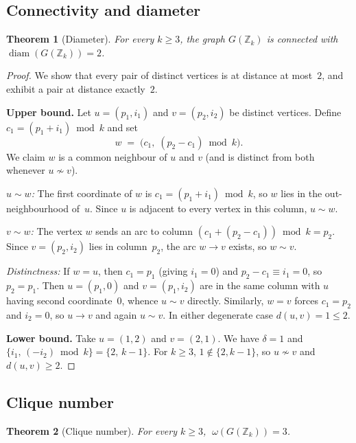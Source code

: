 \documentclass[12pt]{article}
\newtheorem{theorem}{Theorem}[section]
\theoremstyle{definition}
\theoremstyle{remark}
\newcommand{\Z}{\mathbb{Z}}
\newcommand{\GZk}{G(\Z_k)}
\begin{document}
\subsection{Connectivity and diameter}

\begin{theorem}[Diameter]
\label{thm:diam}
For every $k \ge 3$, the graph $\GZk$ is connected with
$\operatorname{diam}(\GZk) = 2$.
\end{theorem}

\begin{proof}
We show that every pair of distinct vertices is at distance at most~$2$,
and exhibit a pair at distance exactly~$2$.

\smallskip\noindent\textbf{Upper bound.}
Let $u = (p_1, i_1)$ and $v = (p_2, i_2)$ be distinct vertices.
Define $c_1 = (p_1 + i_1) \bmod k$ and set
\[
  w \;=\; \bigl(c_1,\; (p_2 - c_1) \bmod k\bigr).
\]
We claim $w$ is a common neighbour of $u$ and $v$ (and is distinct from both
whenever $u \not\sim v$).

\emph{$u \sim w$:}  The first coordinate of $w$ is $c_1 = (p_1 + i_1) \bmod k$,
so $w$ lies in the out-neighbourhood of~$u$.  Since $u$ is adjacent to every
vertex in this column, $u \sim w$.

\emph{$v \sim w$:}  The vertex $w$ sends an arc to column
$(c_1 + (p_2 - c_1)) \bmod k = p_2$.  Since $v = (p_2, i_2)$ lies in column~$p_2$,
the arc $w \to v$ exists, so $w \sim v$.

\emph{Distinctness:}  If $w = u$, then $c_1 = p_1$ (giving $i_1 = 0$) and
$p_2 - c_1 \equiv i_1 = 0$, so $p_2 = p_1$.  Then $u = (p_1, 0)$ and
$v = (p_1, i_2)$ are in the same column with $u$ having second coordinate~$0$,
whence $u \sim v$ directly.  Similarly, $w = v$ forces $c_1 = p_2$ and $i_2 = 0$,
so $u \to v$ and again $u \sim v$.  In either degenerate case $d(u,v) = 1 \le 2$.

\smallskip\noindent\textbf{Lower bound.}
Take $u = (1, 2)$ and $v = (2, 1)$.  We have $\delta = 1$ and
$\{i_1,\, (-i_2) \bmod k\} = \{2,\, k-1\}$.  For $k \ge 3$,
$1 \notin \{2, k-1\}$, so $u \not\sim v$ and $d(u,v) \ge 2$.
\end{proof}


\subsection{Clique number}

\begin{theorem}[Clique number]
\label{thm:clique}
For every $k \ge 3$, $\;\omega(\GZk) = 3$.
\end{theorem}
\end{document}
